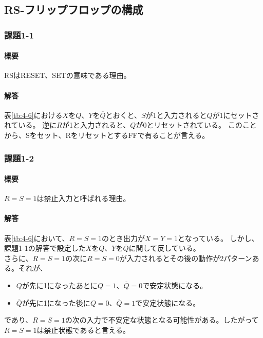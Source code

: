 \documentclass[dvipdfmx]{jsarticle}
\begin{document}
\subsection{RS-フリップフロップの構成}

\subsubsection{課題1-1}

\paragraph{概要}
RSはRESET、SETの意味である理由。

\paragraph{解答}
表\ref{tb:4-6}における$X$を$Q$、$Y$を$\overline{Q}$とおくと、$S$が1と入力されると$Q$が1にセットされている。
逆に$R$が1と入力されると、$Q$が0とリセットされている。
このことから、Sをセット、RをリセットとするFFで有ることが言える。

\subsubsection{課題1-2}

\paragraph{概要}
$R=S=1$は禁止入力と呼ばれる理由。

\paragraph{解答}
表\ref{tb:4-6}において、$R=S=1$のとき出力が$X=Y=1$となっている。
しかし、課題1-1の解答で設定した$X$を$Q$、$Y$を$\overline{Q}$に関して反している。\\

さらに、$R=S=1$の次に$R=S=0$が入力されるとその後の動作が2パターンある。それが、
\begin{itemize}
  \item $Q$が先に1になったあとに$Q=1$、$\overline{Q}=0$で安定状態になる。
  \item $\overline{Q}$が先に1になった後に$Q=0$、$\overline{Q}=1$で安定状態になる。
\end{itemize}
であり、$R=S=1$の次の入力で不安定な状態となる可能性がある。したがって$R=S=1$は禁止状態であると言える。
\end{document}

